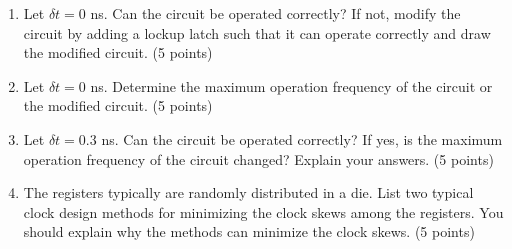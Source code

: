 \documentclass[10pt]{article}
\begin{document}
\begin{enumerate}[label=(\alph*),leftmargin=7mm,itemsep=3pt]
\item Let $\delta t=0$ ns. Can the circuit be operated correctly? If not, modify the circuit by adding a lockup latch such that it can operate correctly and draw the modified circuit. (5 points)
\item Let $\delta t=0$ ns. Determine the maximum operation frequency of the circuit or the modified circuit. (5 points)
\item Let $\delta t=0.3$ ns. Can the circuit be operated correctly? If yes, is the maximum operation frequency of the circuit changed? Explain your answers. (5 points)
\item The registers typically are randomly distributed in a die. List two typical clock design methods for minimizing the clock skews among the registers. You should explain why the methods can minimize the clock skews. (5 points)
\end{enumerate}
\end{document}
